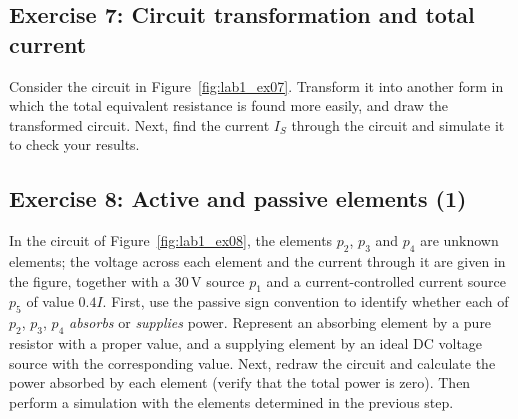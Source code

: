 

\subsection{Exercise 7: Circuit transformation and total current}
Consider the circuit in Figure~\ref{fig:lab1_ex07}. Transform it into another form in which the total equivalent resistance is found more easily, and draw the transformed circuit. Next, find the current $I_S$ through the circuit and simulate it to check your results.






\subsection{Exercise 8: Active and passive elements (1)}
In the circuit of Figure~\ref{fig:lab1_ex08}, the elements $p_2$, $p_3$ and $p_4$ are unknown elements; the voltage across each element and the current through it are given in the figure, together with a 30\,V source $p_1$ and a current-controlled current source $p_5$ of value $0.4I$. First, use the passive sign convention to identify whether each of $p_2$, $p_3$, $p_4$ \emph{absorbs} or \emph{supplies} power. Represent an absorbing element by a pure resistor with a proper value, and a supplying element by an ideal DC voltage source with the corresponding value. Next, redraw the circuit and calculate the power absorbed by each element (verify that the total power is zero). Then perform a simulation with the elements determined in the previous step.

